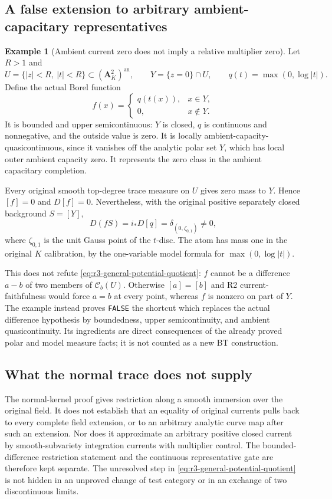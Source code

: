 \documentclass[11pt,a4paper]{article}
\numberwithin{equation}{section}
\theoremstyle{definition}
\newtheorem{example}[theorem]{Example}
\theoremstyle{remark}
\newcommand{\Cb}{\mathcal C_b}
\newcommand{\an}{\mathrm{an}}
\begin{document}
\subsection{A false extension to arbitrary ambient-capacitary representatives}

\begin{example}[Ambient current zero does not imply a relative multiplier zero]
\label{ex:r3-polar-representative-quotient}
Let $R>1$ and
\[
 U=\{|z|<R,\ |t|<R\}\subset(\mathbf A^2_K)^{\an},
 \qquad Y=\{z=0\}\cap U,
 \qquad q(t)=\max(0,\log|t|).
\]
Define the actual Borel function
\[
 f(x)=\begin{cases}q(t(x)),&x\in Y,\\0,&x\notin Y.\end{cases}
\]
It is bounded and upper semicontinuous: $Y$ is closed, $q$ is
continuous and nonnegative, and the outside value is zero.
It is locally ambient-capacity-quasicontinuous, since it vanishes
off the analytic polar set $Y$, which has local outer ambient
capacity zero. It represents the zero class in the ambient
capacitary completion.

Every original smooth top-degree trace measure on $U$ gives
zero mass to $Y$. Hence $[f]=0$ and $D[f]=0$. Nevertheless,
with the original positive separately closed background $S=[Y]$,
\[
 D(fS)=i_*D[q]=\delta_{(0,\zeta_{0,1})}\ne0,
\]
where $\zeta_{0,1}$ is the unit Gauss point of the $t$-disc.
The atom has mass one in the original $K$ calibration, by the
one-variable model formula for $\max(0,\log|t|)$.

This does not refute \eqref{eq:r3-general-potential-quotient}:
$f$ cannot be a difference $a-b$ of two members of $\Cb(U)$.
Otherwise $[a]=[b]$ and R2 current-faithfulness would force
$a=b$ at every point, whereas $f$ is nonzero on part of $Y$.
The example instead proves \texttt{FALSE} the shortcut which
replaces the actual difference hypothesis by boundedness,
upper semicontinuity, and ambient quasicontinuity. Its ingredients
are direct consequences of the already proved polar and model
measure facts; it is not counted as a new BT construction.
\end{example}

\subsection{What the normal trace does not supply}

The normal-kernel proof gives restriction along a smooth immersion
over the original field. It does not establish that an equality
of original currents pulls back to every complete field extension,
or to an arbitrary analytic curve map after such an extension.
Nor does it approximate an arbitrary positive closed current by
smooth-subvariety integration currents with multiplier control.
The bounded-difference restriction statement and the continuous
representative gate are therefore kept separate. The unresolved
step in \eqref{eq:r3-general-potential-quotient} is not hidden in
an unproved change of test category or in an exchange of two
discontinuous limits.
\end{document}
